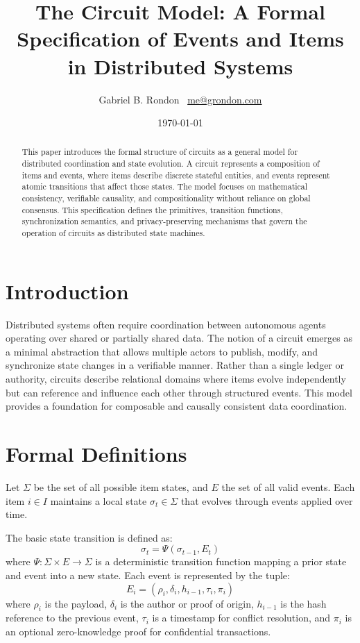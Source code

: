 \documentclass{article}
\title{\textbf{The Circuit Model: A Formal Specification of Events and Items in Distributed Systems}}
\author{Gabriel B. Rondon \ \href{mailto:me@grondon.com}{me@grondon.com}}
\date{\today}
\begin{document}
\maketitle

\begin{abstract}
This paper introduces the formal structure of circuits as a general model for distributed coordination and state evolution. A circuit represents a composition of items and events, where items describe discrete stateful entities, and events represent atomic transitions that affect those states. The model focuses on mathematical consistency, verifiable causality, and compositionality without reliance on global consensus. This specification defines the primitives, transition functions, synchronization semantics, and privacy-preserving mechanisms that govern the operation of circuits as distributed state machines.
\end{abstract}

\section{Introduction}

Distributed systems often require coordination between autonomous agents operating over shared or partially shared data. The notion of a circuit emerges as a minimal abstraction that allows multiple actors to publish, modify, and synchronize state changes in a verifiable manner. Rather than a single ledger or authority, circuits describe relational domains where items evolve independently but can reference and influence each other through structured events. This model provides a foundation for composable and causally consistent data coordination.

\section{Formal Definitions}

Let $\Sigma$ be the set of all possible item states, and $E$ the set of all valid events. Each item $i \in I$ maintains a local state $\sigma_t \in \Sigma$ that evolves through events applied over time.

The basic state transition is defined as:
\begin{equation}
\sigma_{t} = \Psi(\sigma_{t-1}, E_t)
\end{equation}
where $\Psi : \Sigma \times E \to \Sigma$ is a deterministic transition function mapping a prior state and event into a new state. Each event is represented by the tuple:
\begin{equation}
E_i = (\rho_i, \delta_i, h_{i-1}, \tau_i, \pi_i)
\end{equation}
where $\rho_i$ is the payload, $\delta_i$ is the author or proof of origin, $h_{i-1}$ is the hash reference to the previous event, $\tau_i$ is a timestamp for conflict resolution, and $\pi_i$ is an optional zero-knowledge proof for confidential transactions.
\end{document}
